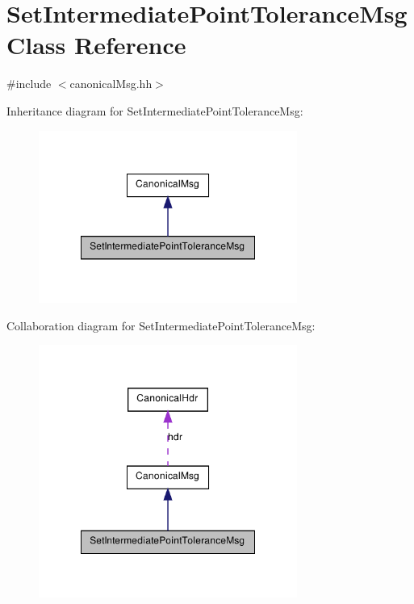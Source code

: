 \hypertarget{class_set_intermediate_point_tolerance_msg}{
\section{SetIntermediatePointToleranceMsg Class Reference}
\label{class_set_intermediate_point_tolerance_msg}
}


{\ttfamily \#include $<$canonicalMsg.hh$>$}



Inheritance diagram for SetIntermediatePointToleranceMsg:\nopagebreak
\begin{figure}[H]
\begin{center}
\leavevmode
\includegraphics[width=240pt]{class_set_intermediate_point_tolerance_msg__inherit__graph}
\end{center}
\end{figure}


Collaboration diagram for SetIntermediatePointToleranceMsg:\nopagebreak
\begin{figure}[H]
\begin{center}
\leavevmode
\includegraphics[width=240pt]{class_set_intermediate_point_tolerance_msg__coll__graph}
\end{center}
\end{figure}
